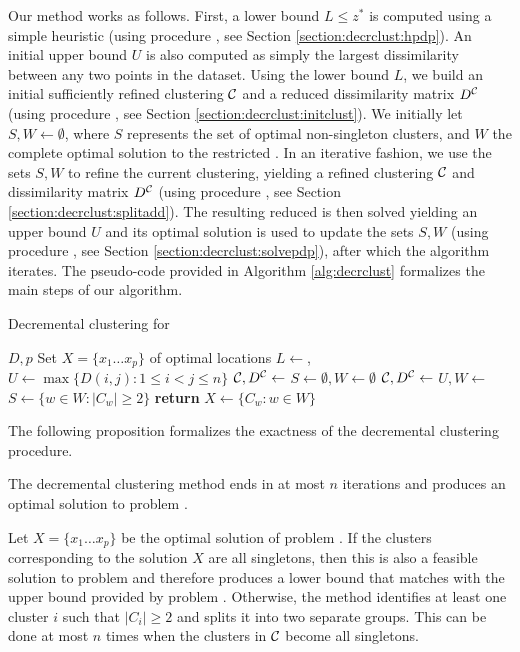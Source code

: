 \documentclass[ijoo,nonblindrev]{informs-ijoo}
\begin{document}
Our method works as follows. First, a lower bound $L \leq z^*$ is computed using a simple heuristic (using procedure , see Section \ref{section:decrclust:hpdp}). An initial upper bound $U$ is also computed as simply the largest dissimilarity between any two points in the dataset. Using the lower bound $L$, we build an initial sufficiently refined clustering $\mathcal{C}$ and a reduced dissimilarity matrix $D^{\mathcal{C}}$ (using procedure , see Section \ref{section:decrclust:initclust}). We initially let $S, W\leftarrow\emptyset$, where $S$ represents the set of optimal non-singleton clusters, and $W$ the complete optimal solution to the restricted \pDP{}. In an iterative fashion, we use the sets $S, W$ to refine the current clustering, yielding a refined clustering $\mathcal{C}$ and dissimilarity matrix $D^{\mathcal{C}}$ (using procedure , see Section \ref{section:decrclust:splitadd}). The resulting reduced \pDP{} is then solved yielding an upper bound $U$ and its optimal solution is used to update the sets $S, W$ (using procedure , see Section \ref{section:decrclust:solvepdp}), after which the algorithm iterates. The pseudo-code provided in 
Algorithm \ref{alg:decrclust} formalizes the main steps of our algorithm.%

\begin{algorithm}[H]
	\caption{Decremental clustering for \label{alg:decrclust}}
	\begin{algorithmic}\normalsize
		\Require $D, p$
		\Ensure Set $X = \{x_1\ldots x_p\}$ of optimal locations
		\State $L\leftarrow$, $U\leftarrow\max\{D(i, j): 1\leq i < j \leq n\}$
		\State $\mathcal{C}, D^{\mathcal{C}}\leftarrow$
		\State $S\leftarrow\emptyset, W\leftarrow\emptyset$
		\Repeat
			\State $\mathcal{C}, D^{\mathcal{C}}\leftarrow$
			\State $U, W\leftarrow$%
			\State $S\leftarrow\{w\in W : |C_w| \geq 2\}$
		\State \textbf{return} $X\leftarrow\{C_w: w\in W\}$
	\end{algorithmic}
\end{algorithm}

The following proposition formalizes the exactness of the decremental clustering procedure.

\begin{proposition}\label{proposition:prop1}
	The decremental clustering method ends in at most $n$ iterations and produces an optimal solution to problem .
\end{proposition}
	Let $X = \{x_1\ldots x_p\}$ be the optimal solution of problem . If the clusters corresponding to the solution $X$ are all singletons, then this is also a feasible solution to problem  and therefore produces a lower bound that matches with the upper bound provided by problem . Otherwise, the method identifies at least one cluster $i$ such that $|C_i| \geq 2$ and splits it into two separate groups. This can be done at most $n$ times when the clusters in $\mathcal{C}$ become all singletons.\Halmos
\endproof
\end{document}
